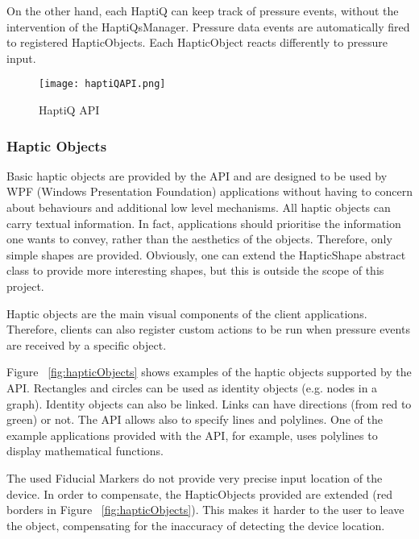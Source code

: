 On the other hand, each HaptiQ can keep track of pressure events, without the intervention of the HaptiQsManager. Pressure data events are automatically fired to registered HapticObjects. Each HapticObject reacts differently to pressure input. 

\begin{figure}[H]
  \centering
  \texttt{[image: haptiQAPI.png]}
  \caption{HaptiQ API}
  \label{fig:haptiQ_api}
\end{figure}

\subsubsection{Haptic Objects}
Basic haptic objects are provided by the API and are designed to be used by WPF (Windows Presentation Foundation) applications without having to concern about behaviours and additional low level mechanisms. All haptic objects can carry textual information. In fact, applications should prioritise the information one wants to convey, rather than the aesthetics of the objects. Therefore, only simple shapes are provided. Obviously, one can extend the HapticShape abstract class to provide more interesting shapes, but this is outside the scope of this project.

Haptic objects are the main visual components of the client applications. Therefore, clients can also register custom actions to be run when pressure events are received by a specific object.

Figure ~\ref{fig:hapticObjects} shows examples of the haptic objects supported by the API. Rectangles and circles can be used as identity objects (e.g. nodes in a graph). Identity objects can also be linked. Links can have directions (from red to green) or not. The API allows also to specify lines and polylines. One of the example applications provided with the API, for example, uses polylines to display mathematical functions.

The used Fiducial Markers do not provide very precise input location of the device. In order to compensate, the HapticObjects provided are extended (red borders in Figure ~\ref{fig:hapticObjects}). This makes it harder to the user to leave the object, compensating for the inaccuracy of detecting the device location.

